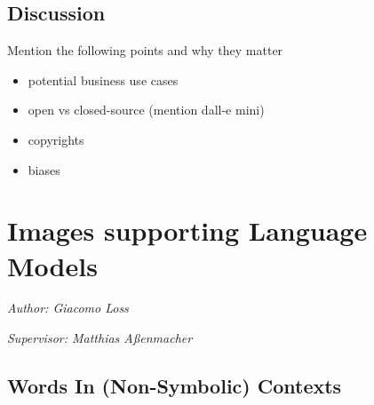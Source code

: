 \documentclass[
]{krantz}
\providecommand{\tightlist}{%
  \setlength{\itemsep}{0pt}\setlength{\parskip}{0pt}}
\begin{document}
\hypertarget{discussion-1}{%
\subsection{Discussion}\label{discussion-1}}

Mention the following points and why they matter

\begin{itemize}
\tightlist
\item
  potential business use cases
\item
  open vs closed-source (mention dall-e mini)
\item
  copyrights
\item
  biases
\end{itemize}

\hypertarget{c02-03-img-support-text}{%
\section{Images supporting Language Models}\label{c02-03-img-support-text}}

\emph{Author: Giacomo Loss}

\emph{Supervisor: Matthias Aßenmacher}

\hypertarget{words-in-non-symbolic-contexts}{%
\subsection{Words In (Non-Symbolic) Contexts}\label{words-in-non-symbolic-contexts}}
\end{document}
